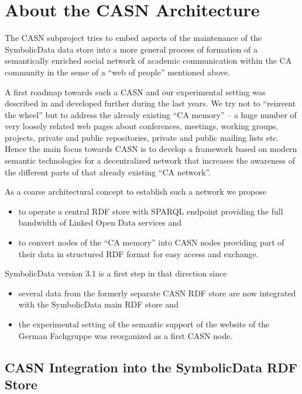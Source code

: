\documentclass{llncs}
\newcommand{\SD}{{\sc Symbo\-lic\-Data}}
\begin{document}
\section{About the CASN Architecture}

The CASN subproject tries to embed aspects of the maintenance of the {\SD}
data store into a more general process of formation of a semantically enriched
social network of academic communication within the CA community in the sense
of a ``web of people'' mentioned above.

A first roadmap towards such a CASN and our experimental setting was described
in \cite{cicm-14} and developed further during the last years.  We try not to
``reinvent the wheel'' but to address the already existing ``CA memory'' -- a
huge number of very loosely related web pages about conferences, meetings,
working groups, projects, private and public repositories, private and public
mailing lists etc. Hence the main focus towards CASN is to develop a framework
based on modern semantic technologies for a decentralized network that
increases the awareness of the different parts of that already existing ``CA
network''.
\medskip

As a coarse architectural concept to establish such a network we propose
\begin{itemize}
\item to operate a central RDF store with SPARQL endpoint providing the full
  bandwidth of Linked Open Data services and 
\item to convert nodes of the ``CA memory'' into CASN nodes providing part of
  their data in structured RDF format for easy access and exchange.
\end{itemize}
{\SD} version 3.1 is a first step in that direction since
\begin{itemize}
\item several data from the formerly separate CASN RDF store are now
  integrated with the {\SD} main RDF store \cite{sdstore} and
\item the experimental setting of the semantic support of the website of the
  German Fachgruppe \cite{cafg} was reorganized as a first CASN node.
\end{itemize}

\subsection*{CASN Integration into the {\SD} RDF Store}
\end{document}
